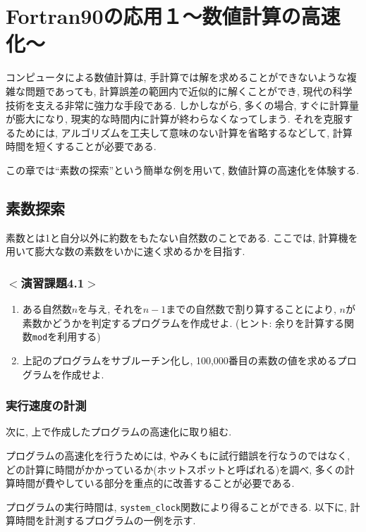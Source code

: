 \chapter{Fortran90の応用１〜数値計算の高速化〜}

コンピュータによる数値計算は, 手計算では解を求めることができないような複雑な問題であっても, 
計算誤差の範囲内で近似的に解くことができ, 現代の科学技術を支える非常に強力な手段である.  
しかしながら, 多くの場合, すぐに計算量が膨大になり, 現実的な時間内に計算が終わらなくなってしまう. 
それを克服するためには, アルゴリズムを工夫して意味のない計算を省略するなどして, 
計算時間を短くすることが必要である. 

この章では``素数の探索''という簡単な例を用いて, 数値計算の高速化を体験する. 


\section{素数探索}
素数とは1と自分以外に約数をもたない自然数のことである.
ここでは, 計算機を用いて膨大な数の素数をいかに速く求めるかを目指す. 

\subsection*{$<$演習課題4.1$>$}
\begin{enumerate}
\item ある自然数$n$を与え, それを$n-1$までの自然数で割り算することにより, 
$n$が素数かどうかを判定するプログラムを作成せよ. 
(ヒント: 余りを計算する関数\verb|mod|を利用する)
\item 上記のプログラムをサブルーチン化し, 100,000番目の素数の値を求めるプログラムを作成せよ. 
\end{enumerate}

\subsection{実行速度の計測}
次に, 上で作成したプログラムの高速化に取り組む. 

プログラムの高速化を行うためには, やみくもに試行錯誤を行なうのではなく, 
どの計算に時間がかかっているか(ホットスポットと呼ばれる)を調べ, 
多くの計算時間が費やしている部分を重点的に改善することが必要である. 

プログラムの実行時間は, \verb|system_clock|関数により得ることができる.
以下に, 計算時間を計測するプログラムの一例を示す. 




